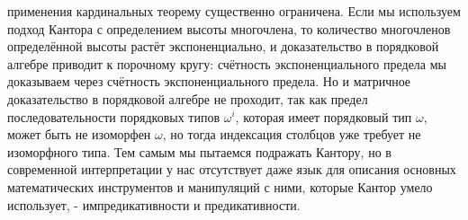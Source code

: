 \documentclass[12pt]{article}
\begin{document}
применения кардинальных теорему существенно ограничена. Если мы используем подход Кантора с определением высоты многочлена, то количество многочленов определённой высоты растёт экспоненциально, и доказательство в порядковой алгебре приводит к порочному кругу: счётность экспоненциального предела мы доказываем через счётность экспоненциального предела. Но и матричное доказательство в порядковой алгебре не проходит, так как предел последовательности порядковых типов $\omega^i$, которая имеет порядковый тип $\omega$, может быть не изоморфен $\omega$, но тогда индексация столбцов уже требует не изоморфного типа. Тем самым мы пытаемся подражать Кантору, но в современной интерпретации у нас отсутствует даже язык для описания основных математических инструментов и манипуляций с ними, которые Кантор умело использует, - импредикативности и предикативности. 
\end{document}
